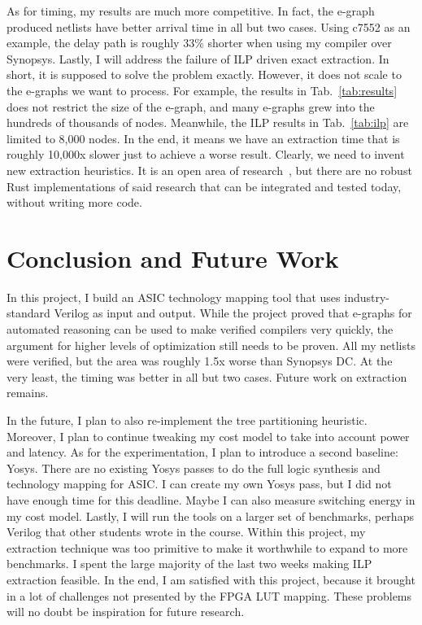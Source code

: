 \documentclass[10pt,letterpaper]{article}
\begin{document}
As for timing, my results are much more competitive. In fact, the e-graph
produced netlists have better arrival time in all but two cases. Using c7552 as
an example, the delay path is roughly 33\% shorter when using my compiler over
Synopsys. Lastly, I will address the failure of ILP driven exact extraction. In
short, it is supposed to solve the problem exactly. However, it does not scale
to the e-graphs we want to process. For example, the results in
Tab.~\ref{tab:results} does not restrict the size of the e-graph, and many
e-graphs grew into the hundreds of thousands of nodes. Meanwhile, the ILP
results in Tab.~\ref{tab:ilp} are limited to 8,000 nodes. In the end, it means
we have an extraction time that is roughly 10,000x slower just to achieve a
worse result. Clearly, we need to invent new extraction heuristics. It is an
open area of research~\cite{smoothe,sparsextract,ilpextract}, but there are no
robust Rust implementations of said research that can be integrated and tested
today, without writing more code.

\section{Conclusion and Future Work}\label{sec:conclusion}

In this project, I build an ASIC technology mapping tool that uses
industry-standard Verilog as input and output. While the project proved that
e-graphs for automated reasoning can be used to make verified compilers very
quickly, the argument for higher levels of optimization still needs to be
proven. All my netlists were verified, but the area was roughly 1.5x worse than
Synopsys DC. At the very least, the timing was better in all but two cases.
Future work on extraction remains.

In the future, I plan to also re-implement the tree partitioning heuristic.
Moreover, I plan to continue tweaking my cost model to take into account power
and latency. As for the experimentation, I plan to introduce a second baseline:
Yosys. There are no existing Yosys passes to do the full logic synthesis and
technology mapping for ASIC. I can create my own Yosys pass, but I did not have
enough time for this deadline. Maybe I can also measure switching energy in my
cost model. Lastly, I will run the tools on a larger set of benchmarks, perhaps
Verilog that other students wrote in the course. Within this project, my
extraction technique was too primitive to make it worthwhile to expand to more
benchmarks. I spent the large majority of the last two weeks making ILP
extraction feasible. In the end, I am satisfied with this project, because it
brought in a lot of challenges not presented by the FPGA LUT mapping. These
problems will no doubt be inspiration for future research.

\nocite{*}



\end{document}
